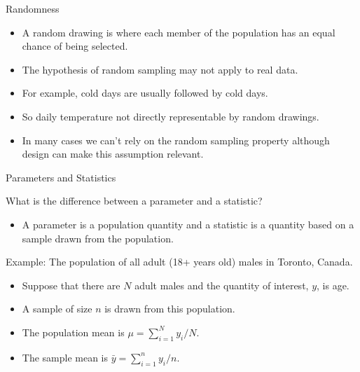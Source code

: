 \documentclass[9pt,ignorenonframetext,]{beamer}
\providecommand{\tightlist}{%
\setlength{\itemsep}{0pt}\setlength{\parskip}{0pt}}
\begin{document}
\begin{frame}{Randomness}

\begin{itemize}
\tightlist
\item
  A random drawing is where each member of the population has an equal
  chance of being selected.
\item
  The hypothesis of random sampling may not apply to real data.
\item
  For example, cold days are usually followed by cold days.\\
\item
  So daily temperature not directly representable by random drawings.
\item
  In many cases we can't rely on the random sampling property although
  design can make this assumption relevant.
\end{itemize}

\end{frame}

\begin{frame}{Parameters and Statistics}

What is the difference between a parameter and a statistic?

\begin{itemize}
\tightlist
\item
  A parameter is a population quantity and a statistic is a quantity
  based on a sample drawn from the population.
\end{itemize}

Example: The population of all adult (18+ years old) males in Toronto,
Canada.

\begin{itemize}
\tightlist
\item
  Suppose that there are \(N\) adult males and the quantity of interest,
  \(y\), is age.\\
\item
  A sample of size \(n\) is drawn from this population.\\
\item
  The population mean is \(\mu=\sum_{i=1}^N y_i /N\).
\item
  The sample mean is \({\bar y}=\sum_{i=1}^n y_i /n\).
\end{itemize}

\end{frame}
\end{document}
